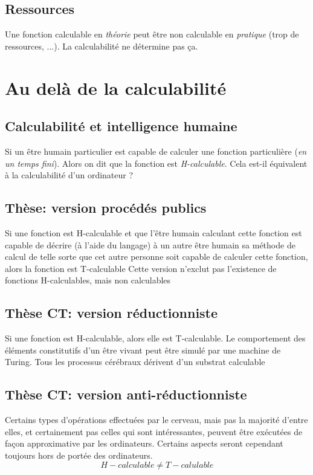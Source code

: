 \documentclass{report}
\begin{document}
\subsection{Ressources}
Une fonction calculable en \textit{théorie} peut être non calculable en \textit{pratique} (trop de ressources, ...). La calculabilité ne détermine pas ça.

\section{Au delà de la calculabilité}
\subsection{Calculabilité et intelligence humaine}
Si un être humain particulier est capable de calculer une fonction particulière (\textit{en un temps fini}). Alors on dit que la fonction est \textit{H-calculable}. Cela est-il équivalent à la calculabilité d'un ordinateur ?

\subsection{Thèse: version procédés publics}
Si une fonction est H-calculable et que l'être humain calculant cette fonction
est capable de décrire (à l'aide du langage) à un autre être humain sa
méthode de calcul de telle sorte que cet autre personne soit capable de
calculer cette fonction,
alors la fonction est T-calculable
Cette version n'exclut pas l'existence de fonctions H-calculables, mais non
calculables

\subsection{Thèse CT: version réductionniste}
Si une fonction est H-calculable, alors elle est T-calculable. Le comportement des éléments constitutifs d'un être vivant peut être simulé
par une machine de Turing. Tous les processus cérébraux dérivent d’un substrat calculable

\subsection{Thèse CT:  version anti-réductionniste}
Certains types d'opérations effectuées par le cerveau, mais pas la majorité d'entre elles, et certainement pas celles qui sont intéressantes, peuvent être exécutées de façon approximative par les ordinateurs. Certains aspects seront cependant toujours hors de portée des ordinateurs.
\begin{equation}
H-calculable \neq T-calulable
\end{equation}
\end{document}

